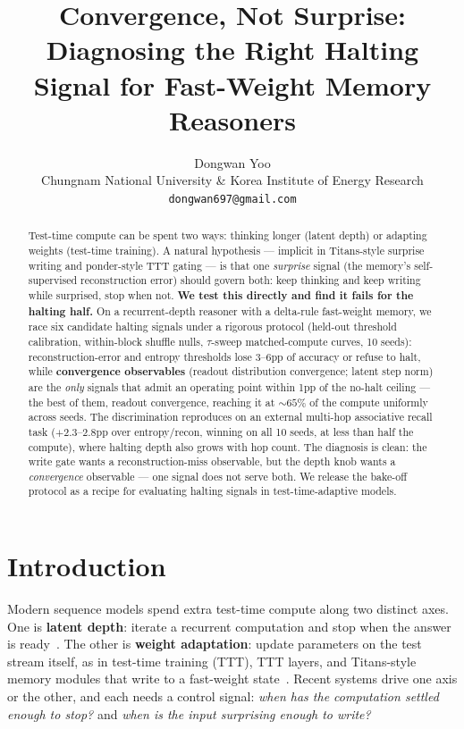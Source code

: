\documentclass{article}
\title{Convergence, Not Surprise: Diagnosing the Right Halting Signal for
Fast-Weight Memory Reasoners}
\author{%
  Dongwan Yoo\\
  Chungnam National University \& Korea Institute of Energy Research\\
  \texttt{dongwan697@gmail.com}
}
\begin{document}
\maketitle

\begin{abstract}
Test-time compute can be spent two ways: thinking longer (latent depth) or
adapting weights (test-time training). A natural hypothesis --- implicit in
Titans-style surprise writing and ponder-style TTT gating --- is that one
\emph{surprise} signal (the memory's self-supervised reconstruction error)
should govern both: keep thinking and keep writing while surprised, stop when
not. \textbf{We test this directly and find it fails for the halting half.} On
a recurrent-depth reasoner with a delta-rule fast-weight memory, we race six
candidate halting signals under a rigorous protocol (held-out threshold
calibration, within-block shuffle nulls, $\tau$-sweep matched-compute curves,
10 seeds): reconstruction-error and entropy thresholds lose 3--6pp of accuracy
or refuse to halt, while \textbf{convergence observables} (readout distribution
convergence; latent step norm) are the \emph{only} signals that admit an
operating point within 1pp of the no-halt ceiling --- the best of them, readout
convergence, reaching it at ${\sim}65\%$ of the compute uniformly across seeds.
The discrimination reproduces on an external multi-hop associative recall task
($+2.3$--$2.8$pp over entropy/recon, winning on all 10 seeds, at less than half
the compute), where halting depth also grows with hop count. The diagnosis is
clean: the write gate wants a reconstruction-miss observable, but the depth
knob wants a \emph{convergence} observable --- one signal does not serve both.
We release the bake-off protocol as a recipe for evaluating halting signals in
test-time-adaptive models.
\end{abstract}

\section{Introduction}

Modern sequence models spend extra test-time compute along two distinct axes.
One is \textbf{latent depth}: iterate a recurrent computation and stop when the
answer is ready~\citep{graves2016act,banino2021pondernet,hao2024coconut,geiping2025recurrent}.
The other is \textbf{weight adaptation}: update parameters on the test stream
itself, as in test-time training (TTT), TTT layers, and Titans-style memory
modules that write to a fast-weight
state~\citep{sun2020ttt,sun2024tttlayers,behrouz2025titans}. Recent systems
drive one axis or the other, and each needs a control signal: \emph{when has
the computation settled enough to stop?} and \emph{when is the input surprising
enough to write?}
\end{document}
